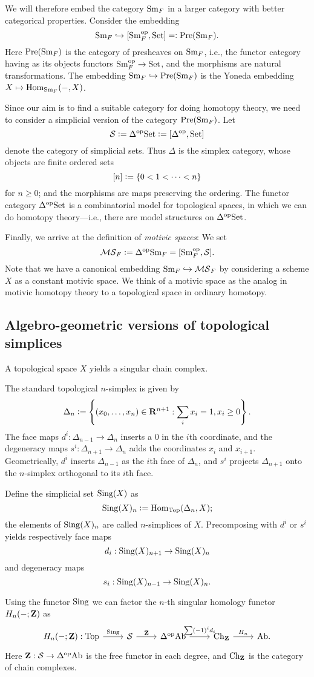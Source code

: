 We will therefore embed the category $\mathrm{Sm}_F$ in a larger category with better categorical properties. Consider the embedding
\[
\mathrm{Sm}_F\hookrightarrow[\mathrm{Sm}_F^{\mathrm{op}},\mathrm{Set}]=\vcentcolon\mathrm{Pre}(\mathrm{Sm}_F).
\]Here $\mathrm{Pre}(\mathrm{Sm}_F)$ is the category of presheaves on $\mathrm{Sm}_F$, i.e., the functor category having as its objects functors $\mathrm{Sm}_F^{\mathrm{op}}\to\mathrm{Set}$, and the morphisms are natural transformations. The embedding $\mathrm{Sm}_F\hookrightarrow\mathrm{Pre}(\mathrm{Sm}_F)$ is the Yoneda embedding $X\mapsto\operatorname{Hom}_{\mathrm{Sm}_F}(-,X)$.

Since our aim is to find a suitable category for doing homotopy theory, we need to consider a simplicial version of the category $\mathrm{Pre}(\mathrm{Sm}_F)$. Let 
\[\mathcal{S}\vcentcolon=\Delta^{\mathrm{op}}\mathrm{Set}\vcentcolon=[\Delta^{\mathrm{op}},\mathrm{Set}]\]
denote the category of simplicial sets. Thus $\Delta$ is the simplex category, whose objects are finite ordered sets
\[[n]\vcentcolon=\{0<1<\cdots<n\}\]for $n\ge0$; and the morphisms are maps preserving the ordering. The functor category $\Delta^{\mathrm{op}}\mathrm{Set}$ is a combinatorial model for topological spaces, in which we can do homotopy theory---i.e., there are model structures on $\Delta^{\mathrm{op}}\mathrm{Set}$.

Finally, we arrive at the definition of \emph{motivic spaces}: We set
\[
\mathcal{MS}_F\vcentcolon=\Delta^{\mathrm{op}}\mathrm{Sm}_F=[\mathrm{Sm}_F^{\mathrm{op}},\mathcal{S}].
\]
Note that we have a canonical embedding $\mathrm{Sm}_F\hookrightarrow\mathcal{MS}_F$ by considering a scheme $X$ as a constant motivic space. We think of a motivic space as the analog in motivic homotopy theory to a topological space in ordinary homotopy.

\subsection{Algebro-geometric versions of topological simplices}

\begin{example}
A topological space $X$ yields a singular chain complex. 

The standard topological $n$-simplex is given by
\[
\Delta_n\vcentcolon=\left\{(x_0,\dots,x_n)\in\mathbf{R}^{n+1}:\sum_i x_i=1,x_i\ge0\right\}.
\]The face maps $d^i:\Delta_{n-1}\to\Delta_n$ inserts a 0 in the $i$th coordinate, and the degeneracy maps $s^i:\Delta_{n+1}\to\Delta_n$ adds the coordinates $x_i$ and $x_{i+1}$. Geometrically, $d^i$ inserts $\Delta_{n-1}$ as the $i$th face of $\Delta_n$, and $s^i$ projects $\Delta_{n+1}$ onto the $n$-simplex orthogonal to its $i$th face.


Define the simplicial set $\operatorname{Sing}(X)$ as
\[\operatorname{Sing}(X)_n\vcentcolon=\operatorname{Hom}_{\mathrm{Top}}(\Delta_n,X);\]
the elements of $\operatorname{Sing}(X)_n$ are called $n$-simplices of $X$. Precomposing with $d^i$ or $s^i$ yields respectively face maps 
\[d_i:\operatorname{Sing}(X)_{n+1}\to\operatorname{Sing}(X)_n\]
and degeneracy maps
\[
s_i:\operatorname{Sing}(X)_{n-1}\to\operatorname{Sing}(X)_n.\]

Using the functor $\operatorname{Sing}$ we can factor the $n$-th singular homology functor $H_n(-;\mathbf{Z})$ as
\[\begin{tikzcd}
H_n(-;\Z):\Top\arrow{r}{\Sing} & \calS\arrow{r}{\Z} & \Delta^\op\Ab\arrow{r}{\sum(-1)^id_i} & \Ch_\Z\arrow{r}{H_n} & \Ab.
\end{tikzcd}\]
Here $\mathbf{Z}:\mathcal{S}\to\Delta^{\mathrm{op}}\mathrm{Ab}$ is the free functor in each degree, and $\mathrm{Ch}_{\mathbf{Z}}$ is the category of chain complexes.
\end{example}

